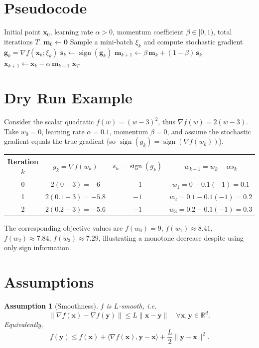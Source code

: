 \documentclass{article}
\newtheorem{assumption}{Assumption}
\newcommand{\sgn}{\operatorname{sign}}
\begin{document}
\section*{Pseudocode}
\begin{algorithm}[H]
\caption{SignSGD with Momentum}
\begin{algorithmic}[1]
\Require Initial point $\mathbf{x}_{0}$, learning rate $\alpha>0$, momentum coefficient $\beta\in[0,1)$, total iterations $T$.
\State $\mathbf{m}_{0}\gets \mathbf{0}$
    \State Sample a mini‑batch $\xi_{k}$ and compute stochastic gradient $\mathbf{g}_{k}= \nabla f(\mathbf{x}_{k};\xi_{k})$
    \State $\mathbf{s}_{k}\gets \sgn(\mathbf{g}_{k})$ 
    \State $\mathbf{m}_{k+1}\gets \beta\,\mathbf{m}_{k}+(1-\beta)\,\mathbf{s}_{k}$
    \State $\mathbf{x}_{k+1}\gets \mathbf{x}_{k}-\alpha\,\mathbf{m}_{k+1}$
\EndFor
\State \Return $\mathbf{x}_{T}$
\end{algorithmic}
\end{algorithm}

\section*{Dry Run Example}
Consider the scalar quadratic $f(w)=(w-3)^{2}$, thus $\nabla f(w)=2(w-3)$.  
Take $w_{0}=0$, learning rate $\alpha=0.1$, momentum $\beta=0$, and assume the stochastic gradient equals the true gradient (so $\sgn(g_{k})=\sgn(\nabla f(w_{k}))$).

\begin{center}
\begin{tabular}{c|c|c|c}
Iteration $k$ & $g_{k}= \nabla f(w_{k})$ & $s_{k}= \sgn(g_{k})$ & $w_{k+1}=w_{k}-\alpha s_{k}$ \\ \hline
0 & $2(0-3)=-6$ & $-1$ & $w_{1}=0-0.1(-1)=0.1$ \\[2pt]
1 & $2(0.1-3)=-5.8$ & $-1$ & $w_{2}=0.1-0.1(-1)=0.2$ \\[2pt]
2 & $2(0.2-3)=-5.6$ & $-1$ & $w_{3}=0.2-0.1(-1)=0.3$
\end{tabular}
\end{center}

The corresponding objective values are $f(w_{0})=9$, $f(w_{1})\approx 8.41$, $f(w_{2})\approx 7.84$, $f(w_{3})\approx 7.29$, illustrating a monotone decrease despite using only sign information.

\section*{Assumptions}
\begin{assumption}[Smoothness]\label{ass:smooth}
$f$ is $L$‑smooth, i.e.
\[
\|\nabla f(\mathbf{x})-\nabla f(\mathbf{y})\|\le L\|\mathbf{x}-\mathbf{y}\|\quad\forall\mathbf{x},\mathbf{y}\in\mathbb{R}^{d}.
\]
Equivalently,
\[
f(\mathbf{y})\le f(\mathbf{x})+\langle\nabla f(\mathbf{x}),\mathbf{y}-\mathbf{x}\rangle
+\frac{L}{2}\|\mathbf{y}-\mathbf{x}\|^{2}.
\]
\end{assumption}
\end{document}
